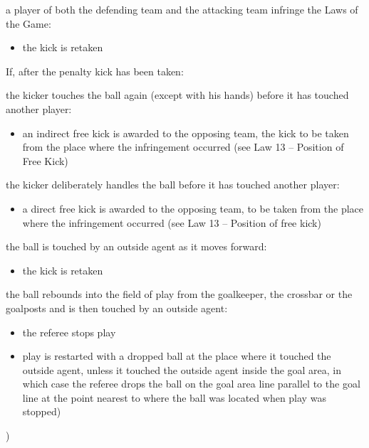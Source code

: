 {\bigskip

a player of both the defending team and the attacking team infringe the
Laws of the Game:

\begin{itemize}
\item the kick is retaken
\end{itemize}

\bigskip

If, after the penalty kick has been taken:

the kicker touches the ball again (except with his hands) before it has
touched another player:

\begin{itemize}
\item an indirect free kick is awarded to the opposing team, the kick to be
taken from the place where the infringement occurred (see Law 13 --
Position of Free Kick)
\end{itemize}

\bigskip

the kicker deliberately handles the ball before it has touched another
player:

\begin{itemize}
\item a direct free kick is awarded to the opposing team, to be taken from the
place where the infringement occurred (see Law 13 -- Position of free
kick)
\end{itemize}

\bigskip

the ball is touched by an outside agent as it moves forward:

\begin{itemize}
\item the kick is retaken
\end{itemize}

\bigskip

the ball rebounds into the field of play from the goalkeeper, the
crossbar or the goalposts and is then touched by an outside agent:

\begin{itemize}
\item the referee stops play
\item play is restarted with a dropped ball at the place where it touched the
outside agent, unless it touched the outside agent inside the goal area,
in which case the referee drops the ball on the goal area line parallel
to the goal line at the point nearest to where the ball was located
when play was stopped)
\end{itemize}
)}
\color{black}